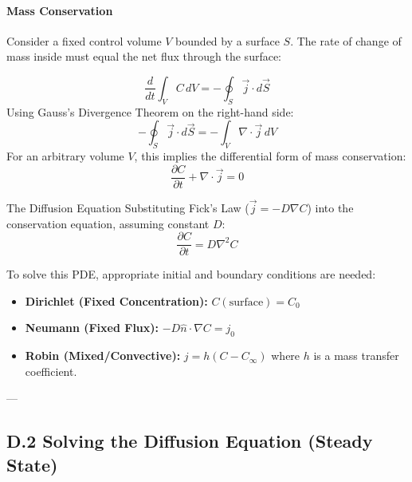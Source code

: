 \paragraph{Mass Conservation}
Consider a fixed control volume $V$ bounded by a surface $S$. The rate of change of mass inside must equal the net flux through the surface:
\begin{center}
\end{center}

\[
\frac{d}{dt}\int_{V}C \, dV = -\oint_{S} \vec{j} \cdot d\vec{S}
\]
Using Gauss's Divergence Theorem on the right-hand side:
\[
-\oint_{S} \vec{j} \cdot d\vec{S} = -\int_{V} \nabla \cdot \vec{j} \, dV
\]
For an arbitrary volume $V$, this implies the differential form of mass conservation:
\[
\frac{\partial C}{\partial t} + \nabla \cdot \vec{j} = 0
\]

\begin{eqbox}{The Diffusion Equation}
Substituting Fick's Law ($\vec{j} = -D\nabla C$) into the conservation equation, assuming constant $D$:
\[
\frac{\partial C}{\partial t} = D\nabla^{2}C
\]
\end{eqbox}

\begin{notebox}
To solve this PDE, appropriate initial and boundary conditions are needed:
\begin{itemize}
    \item \textbf{Dirichlet (Fixed Concentration):} $C(\text{surface}) = C_0$
    \item \textbf{Neumann (Fixed Flux):} $-D \hat{n} \cdot \nabla C = j_0$
    \item \textbf{Robin (Mixed/Convective):} $j = h(C - C_{\infty})$ where $h$ is a mass transfer coefficient.
\end{itemize}
\end{notebox}

---

\subsection{D.2 Solving the Diffusion Equation (Steady State)}

